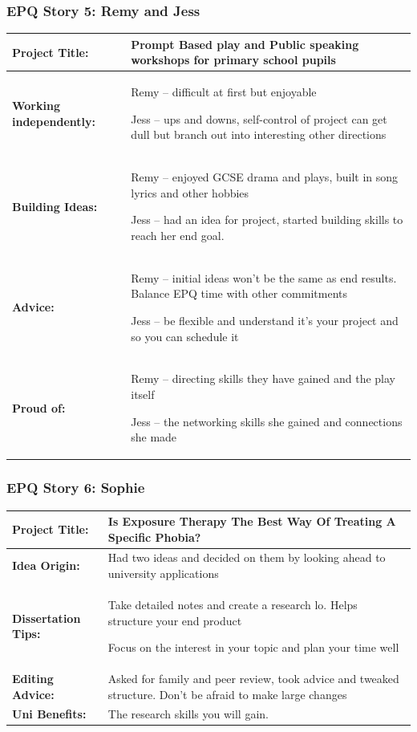 \subsubsection*{EPQ Story 5: Remy and Jess}
\begin{tabularx}{\textwidth}{@{}lX@{}}
    \toprule

    \textbf{Project Title:}          &
    Prompt Based play and Public speaking workshops for primary school pupils

    \\
    \midrule
    \textbf{Working independently:} &
    Remy – difficult at first but enjoyable

    Jess – ups and downs, self-control of project can get dull but branch out into interesting other directions
    \\
    \textbf{Building Ideas:}         &
    Remy – enjoyed GCSE drama and plays, built in song lyrics and other hobbies

    Jess – had an idea for project, started building skills to reach her end goal.
    \\
    \textbf{Advice:}                 &
    Remy – initial ideas won't be the same as end results. Balance EPQ time with other commitments

    Jess – be flexible and understand it's your project and so you can schedule it \\

    \textbf{Proud of:}              &
    Remy – directing skills they have gained and the play itself

    Jess – the networking skills she gained and connections she made              \\
    \bottomrule
\end{tabularx}




\subsubsection*{EPQ Story 6: Sophie }
\begin{tabularx}{\textwidth}{@{}lX@{}}
    \toprule

    \textbf{Project Title:}     &
    Is Exposure Therapy The Best Way Of Treating A Specific Phobia?

    \\
    \midrule
    \textbf{Idea Origin:}      &
    Had two ideas and decided on them by looking ahead to university applications

    \\
    \textbf{Dissertation Tips:} &
    Take detailed notes and create a research lo. Helps structure your end product

    Focus on the interest in your topic and plan your time well
    \\
    \textbf{Editing Advice:}    &
    Asked for family and peer review, took advice and tweaked structure. Don't be afraid to make large changes
    \\

    \textbf{Uni Benefits:}     &
    The research skills you will gain.
    \\
    \bottomrule
\end{tabularx}


